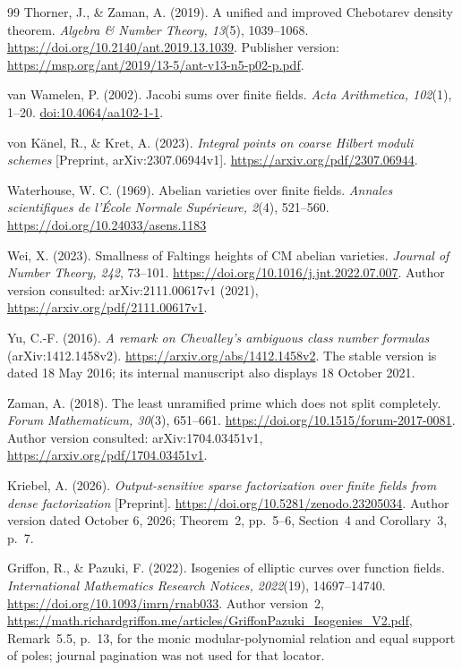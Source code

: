 \documentclass[11pt]{article}
\theoremstyle{definition}
\theoremstyle{remark}
\begin{document}
\begin{thebibliography}{99}
Thorner, J., \& Zaman, A. (2019).
A unified and improved Chebotarev density theorem.
\emph{Algebra \& Number Theory, 13}(5), 1039--1068.
\url{https://doi.org/10.2140/ant.2019.13.1039}.
Publisher version:
\url{https://msp.org/ant/2019/13-5/ant-v13-n5-p02-p.pdf}.

van Wamelen, P. (2002).
Jacobi sums over finite fields.
\emph{Acta Arithmetica, 102}(1), 1--20.
\href{https://doi.org/10.4064/aa102-1-1}{doi:10.4064/aa102-1-1}.

von K\"anel, R., \& Kret, A. (2023).
\emph{Integral points on coarse Hilbert moduli schemes}
[Preprint, arXiv:2307.06944v1].
\url{https://arxiv.org/pdf/2307.06944}.

Waterhouse, W. C. (1969). Abelian varieties over finite fields.
\emph{Annales scientifiques de l'\'Ecole Normale Sup\'erieure, 2}(4),
521--560. \url{https://doi.org/10.24033/asens.1183}

Wei, X. (2023). Smallness of Faltings heights of CM abelian varieties.
\emph{Journal of Number Theory, 242}, 73--101.
\url{https://doi.org/10.1016/j.jnt.2022.07.007}.
Author version consulted: arXiv:2111.00617v1 (2021),
\url{https://arxiv.org/pdf/2111.00617v1}.

Yu, C.-F. (2016). \emph{A remark on Chevalley's ambiguous class
number formulas} (arXiv:1412.1458v2).
\url{https://arxiv.org/abs/1412.1458v2}.
The stable version is dated 18 May 2016; its internal manuscript
also displays 18 October 2021.

Zaman, A. (2018). The least unramified prime which does not split completely.
\emph{Forum Mathematicum, 30}(3), 651--661.
\url{https://doi.org/10.1515/forum-2017-0081}.
Author version consulted: arXiv:1704.03451v1,
\url{https://arxiv.org/pdf/1704.03451v1}.


Kriebel, A. (2026).
\emph{Output-sensitive sparse factorization over finite fields from dense
factorization} [Preprint].
\url{https://doi.org/10.5281/zenodo.23205034}.
Author version dated October 6, 2026; Theorem~2, pp.~5--6,
Section~4 and Corollary~3, p.~7.

Griffon, R., \& Pazuki, F. (2022).
Isogenies of elliptic curves over function fields.
\emph{International Mathematics Research Notices, 2022}(19),
14697--14740.
\url{https://doi.org/10.1093/imrn/rnab033}.
Author version~2,
\url{https://math.richardgriffon.me/articles/GriffonPazuki_Isogenies_V2.pdf},
Remark~5.5, p.~13, for the monic modular-polynomial relation and
equal support of poles; journal pagination was not used for that locator.


\end{thebibliography}
\end{document}
